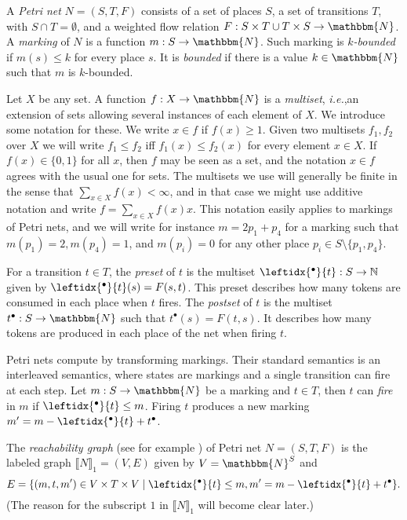 \documentclass[runningheads,envcountsame]{llncs}
\newcommand*\ie{\textit{i.e.},}
\newcommand*\Nat{\mathbbm{N}}
\newcommand*\prepla[1]{\leftidx{^\bullet}{#1}}
\newcommand*\pospla[1]{#1^\bullet}
\newcommand*\sem[1]{\llbracket #1\rrbracket}
\begin{document}
A \emph{Petri net} $N=(S, T, F)$ consists of
a set of places $S$,
a set of transitions $T$,
with $S\cap T=\emptyset$,
and a weighted flow relation $F: S\times T\cup T\times S\to \Nat$.
%
A \emph{marking} of $N$ is a function $m: S\to \Nat$.
Such marking is \emph{$k$-bounded} if $m(s)\leq k$ for every place $s$.
It is \emph{bounded} if there is a value $k\in \Nat$ such that $m$ is $k$-bounded.   

Let $X$ be any set. A function $f: X\to \Nat$ is a \emph{multiset}, \ie an extension of sets allowing several instances of each element of $X$.
We introduce some notation for these.
We write $x\in f$ if $f(x)\ge 1$. Given two multisets $f_1,f_2$ over $X$ we will write $f_1\leq f_2$ iff $f_1(x) \leq f_2(x)$ for every element $x\in X$. If $f(x)\in \{0, 1\}$ for all $x$, then $f$ may be seen as a set, and the notation $x\in f$ agrees with the usual one for sets.
The multisets we use will generally be finite in the sense that $\sum_{x\in X} f(x)<\infty$,
and in that case we might use additive notation and write $f=\sum_{x\in X} f(x) x$.
This notation easily applies to markings of Petri nets,
and we will write for instance $m= 2 p_1 + p_4$ for a marking such that $m(p_1)=2, m(p_4)=1$, and $m(p_i) =0$ for any other place $p_i\in S\setminus\{p_1,p_4\}$.

For a transition $t\in T$, the \emph{preset} of $t$ is the multiset $\prepla{t}:S \to \mathbb N$ given by $\prepla{t}(s)=F(s, t)$.
This preset describes how many tokens are consumed in each place when $t$ fires. 
The \emph{postset} of $t$ is the multiset  $\pospla{t}: S\to \Nat$ such that $\pospla{t}(s)=F(t, s)$.
It describes how many tokens are produced in each place of the net when firing $t$.

Petri nets compute by transforming markings.
Their standard semantics is an interleaved semantics,
where states are markings
and a single transition can fire at each step.
Let $m: S\to \Nat$ be a marking and $t\in T$,
then $t$ can \emph{fire} in $m$ if $\prepla{t}\le m$.
Firing $t$ produces a new marking $m'=m-\prepla{t}+\pospla{t}$.

The \emph{reachability graph} (see for example \cite{Desel1998})
of Petri net $N=(S, T, F)$ is the labeled graph $\sem{N}_1=(V, E)$ given by $V=\Nat^S$ and
\begin{equation*}
  E = \{(m, t, m')\in V\times T\times V\mid \prepla{t}\le m, m'=m-\prepla{t}+\pospla{t}\}.
\end{equation*}
(The reason for the subscript $1$ in $\sem{N}_1$ will become clear later.)
\end{document}
